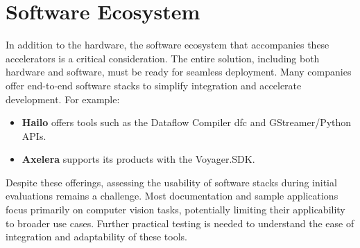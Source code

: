 \section{Software Ecosystem}
In addition to the hardware, the software ecosystem that accompanies these accelerators is a critical consideration. The entire solution, including both hardware and software, must be ready for seamless deployment. Many companies offer end-to-end software stacks to simplify integration and accelerate development. For example:
\begin{itemize}
    \item \textbf{Hailo} offers tools such as the Dataflow Compiler \acrshort{dfc} and GStreamer/Python APIs.
    \item \textbf{Axelera} supports its products with the Voyager.SDK.
\end{itemize}

Despite these offerings, assessing the usability of software stacks during initial evaluations remains a challenge. Most documentation and sample applications focus primarily on computer vision tasks, potentially limiting their applicability to broader use cases. Further practical testing is needed to understand the ease of integration and adaptability of these tools.

